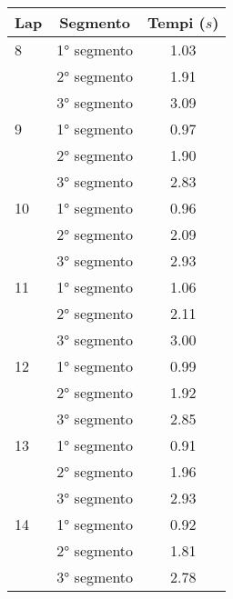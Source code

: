 \documentclass{article}
\begin{document}
\begin{table}[htbp]
\begin{minipage}{0.45\textwidth}
\begin{tabular}{lcc}
        \bottomrule
    \end{tabular}
    \end{minipage}\hfill
    \begin{minipage}{0.45\textwidth}
    \centering
    \begin{tabular}{lcc}
        \toprule
        \textbf{Lap} & \textbf{Segmento} & \textbf{Tempi ($s$)} \\
        \midrule
        8 & 1° segmento & 1.03 \\
          & 2° segmento & 1.91 \\
          & 3° segmento & 3.09 \\
        \midrule
        9 & 1° segmento & 0.97 \\
          & 2° segmento & 1.90 \\
          & 3° segmento & 2.83 \\
        \midrule
        10 & 1° segmento & 0.96 \\
           & 2° segmento & 2.09 \\
           & 3° segmento & 2.93 \\
        \midrule
        11 & 1° segmento & 1.06 \\
           & 2° segmento & 2.11 \\
           & 3° segmento & 3.00 \\
        \midrule
        12 & 1° segmento & 0.99 \\
           & 2° segmento & 1.92 \\
           & 3° segmento & 2.85 \\
        \midrule
        13 & 1° segmento & 0.91 \\
           & 2° segmento & 1.96 \\
           & 3° segmento & 2.93 \\
        \midrule
        14 & 1° segmento & 0.92 \\
           & 2° segmento & 1.81 \\
           & 3° segmento & 2.78 \\
        \bottomrule
    \end{tabular}
    \end{minipage}
\end{table}
\end{document}
